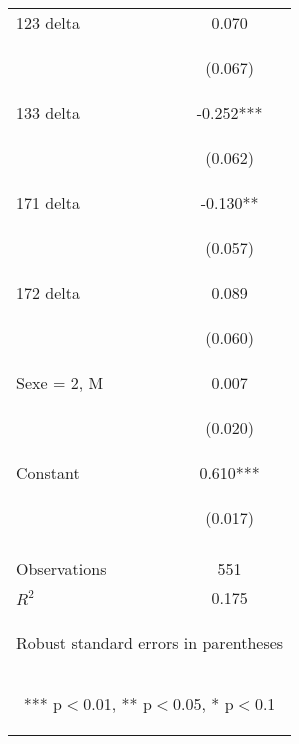 \begin{center}
\begin{tabular}{lc}
123 delta & 0.070 \\
\vspace{4pt} & \begin{footnotesize}(0.067)\end{footnotesize} \\
133 delta & -0.252*** \\
\vspace{4pt} & \begin{footnotesize}(0.062)\end{footnotesize} \\
171 delta & -0.130** \\
\vspace{4pt} & \begin{footnotesize}(0.057)\end{footnotesize} \\
172 delta & 0.089 \\
\vspace{4pt} & \begin{footnotesize}(0.060)\end{footnotesize} \\
Sexe = 2, M & 0.007 \\
\vspace{4pt} & \begin{footnotesize}(0.020)\end{footnotesize} \\
Constant & 0.610*** \\
 & \begin{footnotesize}(0.017)\end{footnotesize} \\
\vspace{4pt} & \begin{footnotesize}\end{footnotesize} \\
Observations & 551 \\
 $R^2$ & 0.175 \\ \hline
\multicolumn{2}{c}{\begin{footnotesize} Robust standard errors in parentheses\end{footnotesize}} \\
\multicolumn{2}{c}{\begin{footnotesize} *** p$<$0.01, ** p$<$0.05, * p$<$0.1\end{footnotesize}} \\
\end{tabular}
\end{center}
